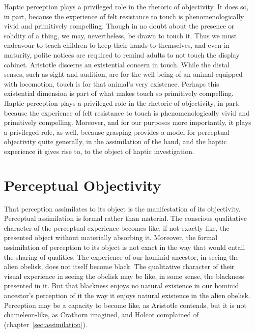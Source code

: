 Haptic perception plays a privileged role in the rhetoric of objectivity. It does so, in part, because the experience of felt resistance to touch is phenomenologically vivid and primitively compelling. Though in no doubt about the presence or solidity of a thing, we may, nevertheless, be drawn to touch it. Thus we must endeavour to teach children to keep their hands to themselves, and even in maturity, polite notices are required to remind adults to not touch the display cabinet. Aristotle discerns an existential concern in touch. While the distal senses, such as sight and audition, are for the well-being of an animal equipped with locomotion, touch is for that animal's very existence. Perhaps this existential dimension is part of what makes touch so primitively compelling. Haptic perception plays a privileged role in the rhetoric of objectivity, in part, because the experience of felt resistance to touch is phenomenologically vivid and primitively compelling. Moreover, and for our purposes more importantly, it plays a privileged role, as well, because grasping provides a model for perceptual objectivity quite generally, in the assimilation of the hand, and the haptic experience it gives rise to, to the object of haptic investigation.


\section{Perceptual Objectivity} %
\label{sec:perceptual_objectivity}

That perception assimilates to its object is the manifestation of its objectivity. Perceptual assimilation is formal rather than material. The conscious qualitative character of the perceptual experience becomes like, if not exactly like, the presented object without materially absorbing it. Moreover, the formal assimilation of perception to its object is not exact in the way that would entail the sharing of qualities. The experience of our hominid ancestor, in seeing the alien obelisk, does not itself become black. The qualitative character of their visual experience in seeing the obelisk may be like, in some sense, the blackness presented in it. But that blackness enjoys no natural existence in our hominid ancestor's perception of it the way it enjoys natural existence in the alien obelisk. Perception may be a capacity to become like, as Aristotle contends, but it is not chameleon-like, as Crathorn imagined, and Holcot complained of (chapter~\ref{sec:assimilation}). 

